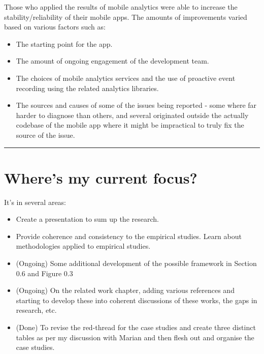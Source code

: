 Those who applied the results of mobile analytics were able to increase the stability/reliability of their mobile apps. The amounts of improvements varied based on various factors such as:
\begin{itemize}
    \itemsep0em
    \item The starting point for the app.
    \item The amount of ongoing engagement of the development team.
    \item The choices of mobile analytics services and the use of proactive event recording using the related analytics libraries.
    \item The sources and causes of some of the issues being reported - some where far harder to diagnose than others, and several originated outside the actually codebase of the mobile app where it might be impractical to truly fix the source of the issue.
\end{itemize}

\noindent
\rule{\textwidth}{0.4pt}

\clearpage
\section{Where's my current focus?}
It's in several areas:
\begin{itemize}
    \item Create a presentation to sum up the research.
    \item Provide coherence and consistency to the empirical studies. Learn about methodologies applied to empirical studies.
    \item (Ongoing) Some additional development of the possible framework in Section 0.6 and Figure 0.3
    \item (Ongoing) On the related work chapter, adding various references and starting to develop these into coherent discussions of these works, the gaps in research, etc.
    \item (Done) To revise the red-thread for the case studies and create three distinct tables as per my discussion with Marian and then flesh out and organise the case studies.
\end{itemize}

